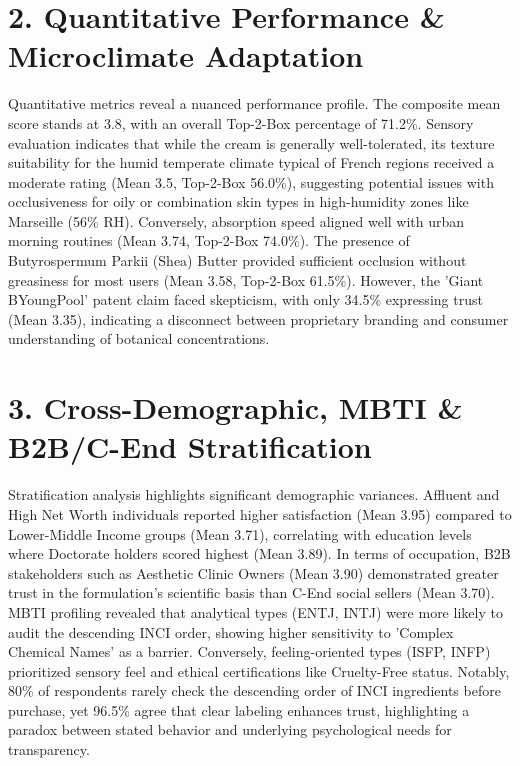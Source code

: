 \documentclass[10pt,twocolumn,a4paper]{article}
\begin{document}
\section{2. Quantitative Performance \& Microclimate Adaptation}
Quantitative metrics reveal a nuanced performance profile. The composite mean score stands at 3.8, with an overall Top-2-Box percentage of 71.2\%. Sensory evaluation indicates that while the cream is generally well-tolerated, its texture suitability for the humid temperate climate typical of French regions received a moderate rating (Mean 3.5, Top-2-Box 56.0\%), suggesting potential issues with occlusiveness for oily or combination skin types in high-humidity zones like Marseille (56\% RH). Conversely, absorption speed aligned well with urban morning routines (Mean 3.74, Top-2-Box 74.0\%). The presence of Butyrospermum Parkii (Shea) Butter provided sufficient occlusion without greasiness for most users (Mean 3.58, Top-2-Box 61.5\%). However, the 'Giant BYoungPool' patent claim faced skepticism, with only 34.5\% expressing trust (Mean 3.35), indicating a disconnect between proprietary branding and consumer understanding of botanical concentrations.
\section{3. Cross-Demographic, MBTI \& B2B/C-End Stratification}
Stratification analysis highlights significant demographic variances. Affluent and High Net Worth individuals reported higher satisfaction (Mean 3.95) compared to Lower-Middle Income groups (Mean 3.71), correlating with education levels where Doctorate holders scored highest (Mean 3.89). In terms of occupation, B2B stakeholders such as Aesthetic Clinic Owners (Mean 3.90) demonstrated greater trust in the formulation's scientific basis than C-End social sellers (Mean 3.70). MBTI profiling revealed that analytical types (ENTJ, INTJ) were more likely to audit the descending INCI order, showing higher sensitivity to 'Complex Chemical Names' as a barrier. Conversely, feeling-oriented types (ISFP, INFP) prioritized sensory feel and ethical certifications like Cruelty-Free status. Notably, 80\% of respondents rarely check the descending order of INCI ingredients before purchase, yet 96.5\% agree that clear labeling enhances trust, highlighting a paradox between stated behavior and underlying psychological needs for transparency.
\end{document}

